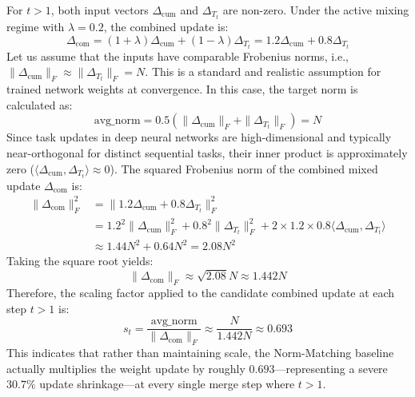 \documentclass{article}
\theoremstyle{plain}
\theoremstyle{definition}
\theoremstyle{remark}
\begin{document}
For $t > 1$, both input vectors $\Delta_{\text{cum}}$ and $\Delta_{T_t}$ are non-zero. Under the active mixing regime with $\lambda = 0.2$, the combined update is:
\begin{equation}
  \Delta_{\text{com}} = (1+\lambda)\Delta_{\text{cum}} + (1-\lambda)\Delta_{T_t} = 1.2 \Delta_{\text{cum}} + 0.8 \Delta_{T_t}
\end{equation}
Let us assume that the inputs have comparable Frobenius norms, i.e., $\|\Delta_{\text{cum}}\|_F \approx \|\Delta_{T_t}\|_F = N$. This is a standard and realistic assumption for trained network weights at convergence. In this case, the target norm is calculated as:
\begin{equation}
  \text{avg\_norm} = 0.5 (\|\Delta_{\text{cum}}\|_F + \|\Delta_{T_t}\|_F) = N
\end{equation}
Since task updates in deep neural networks are high-dimensional and typically near-orthogonal for distinct sequential tasks, their inner product is approximately zero ($\langle \Delta_{\text{cum}}, \Delta_{T_t} \rangle \approx 0$). The squared Frobenius norm of the combined mixed update $\Delta_{\text{com}}$ is:
\begin{align}
  \|\Delta_{\text{com}}\|_F^2 &= \|1.2 \Delta_{\text{cum}} + 0.8 \Delta_{T_t}\|_F^2 \nonumber\\
  &= 1.2^2 \|\Delta_{\text{cum}}\|_F^2 + 0.8^2 \|\Delta_{T_t}\|_F^2 + 2 \times 1.2 \times 0.8 \langle \Delta_{\text{cum}}, \Delta_{T_t} \rangle \nonumber\\
  &\approx 1.44 N^2 + 0.64 N^2 = 2.08 N^2
\end{align}
Taking the square root yields:
\begin{equation}
  \|\Delta_{\text{com}}\|_F \approx \sqrt{2.08} N \approx 1.442 N
\end{equation}
Therefore, the scaling factor applied to the candidate combined update at each step $t > 1$ is:
\begin{equation}
  s_t = \frac{\text{avg\_norm}}{\|\Delta_{\text{com}}\|_F} \approx \frac{N}{1.442 N} \approx 0.693
\end{equation}
This indicates that rather than maintaining scale, the Norm-Matching baseline actually multiplies the weight update by roughly $0.693$—representing a severe $30.7\%$ update shrinkage—at every single merge step where $t > 1$. 
\end{document}
